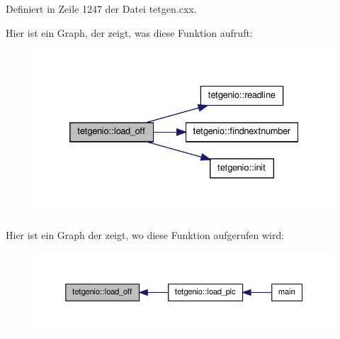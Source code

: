 Definiert in Zeile 1247 der Datei tetgen.\-cxx.



Hier ist ein Graph, der zeigt, was diese Funktion aufruft\-:
\nopagebreak
\begin{figure}[H]
\begin{center}
\leavevmode
\includegraphics[width=332pt]{classtetgenio_a71c8e637cb420c3a87b648405df47abd_cgraph}
\end{center}
\end{figure}




Hier ist ein Graph der zeigt, wo diese Funktion aufgerufen wird\-:
\nopagebreak
\begin{figure}[H]
\begin{center}
\leavevmode
\includegraphics[width=350pt]{classtetgenio_a71c8e637cb420c3a87b648405df47abd_icgraph}
\end{center}
\end{figure}


